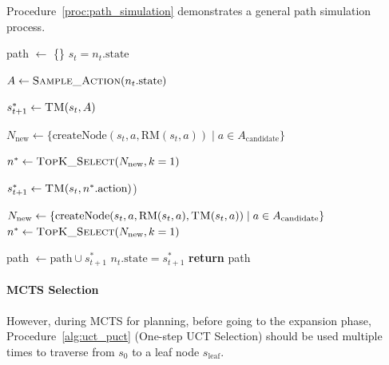 Procedure~\ref{proc:path_simulation} demonstrates a general path simulation process.
\begin{procedure}[h!]
\caption{Path Simulation} 
\label{proc:path_simulation}
\small
\noindent
\begin{algorithmic}[1]
     \State path $\gets$ \{\}
        \State $s_t=n_t.\text{state}$
        
        \State $A \gets \text{\textsc{Sample\_Action}}(n_t.\text{state})$
        
         
            \State $s^{*}_{t+1} \gets \text{\textsc{TM}}(s_t, A)$
        \EndIf
        
            \State $N_{\text{new}} \leftarrow \{ \text{createNode}(s_t, a, \text{RM}(s_t, a)) \mid a \in A_{\text{candidate}} \}$
        
            \State  $n^* \gets \text{\textsc{TopK\_Select}}(N_{\text{new}}, k=1)$ 
        
            \State $s^{*}_{t+1} \gets \text{\textsc{TM}}(s_t, n^*.\text{action})$)
        \EndIf

            \State $N_{\text{new}} \leftarrow \{ \text{createNode}( s_t, a, \text{RM}(s_t, a), \text{\textsc{TM}}(s_t, a) ) \mid a \in A_{\text{candidate}} \}$
            \State  $n^* \gets \text{\textsc{TopK\_Select}}(N_{\text{new}}, k=1)$ 
        \EndIf
        
        \State path $\gets \text{path} \cup s^{*}_{t+1}$
        \State $n_t.\text{state}=s^{*}_{t+1}$
    \EndWhile
    \State \textbf{return} path 
\EndProcedure
\end{algorithmic}
\end{procedure}


\paragraph{MCTS Selection}
However, during MCTS for planning, before going to the expansion phase, Procedure~\ref{alg:uct_puct} (One-step UCT Selection) should be used multiple times to traverse from $s_0$ to a leaf node $s_\text{leaf}$.

